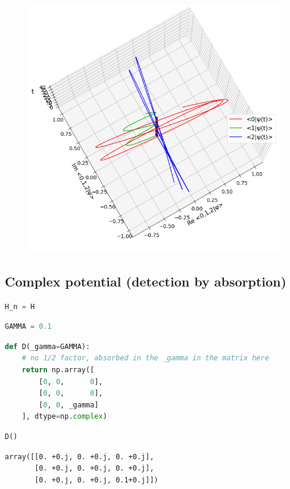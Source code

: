 \begin{figure}[h!]
\centering
\includegraphics[width=0.66\linewidth]{tex/appendix/nb/jupyter/3lev/output_25_1.png}

\end{figure}

\hypertarget{complex-potential-detection-by-absorption}{%
\subsection{Complex potential (detection by
absorption)}\label{complex-potential-detection-by-absorption}}

\begin{lstlisting}[language=Python]
H_n = H
\end{lstlisting}

\begin{lstlisting}[language=Python]
GAMMA = 0.1
\end{lstlisting}

\begin{lstlisting}[language=Python]
def D(_gamma=GAMMA):
    # no 1/2 factor, absorbed in the _gamma in the matrix here
    return np.array([
        [0, 0,      0],
        [0, 0,      0],
        [0, 0, _gamma]
    ], dtype=np.complex)
\end{lstlisting}

\begin{lstlisting}[language=Python]
D()
\end{lstlisting}

\begin{lstlisting}
array([[0. +0.j, 0. +0.j, 0. +0.j],
       [0. +0.j, 0. +0.j, 0. +0.j],
       [0. +0.j, 0. +0.j, 0.1+0.j]])
\end{lstlisting}

